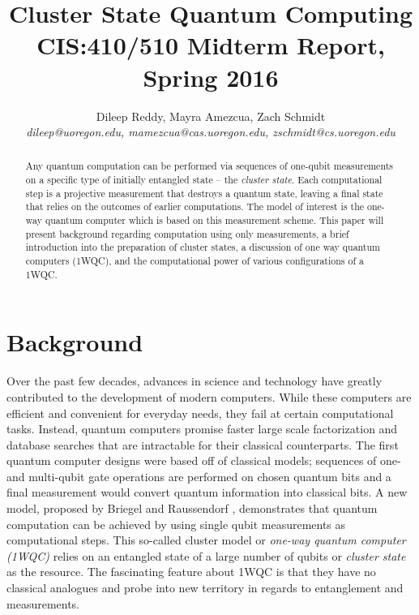 \documentclass[twocolumn]{Styles/IEEEtran11}
\begin{document}


\title{{\Large \bf Cluster State Quantum Computing}\\ {\normalsize CIS:410/510 Midterm Report, Spring 2016}}
\author{
Dileep Reddy, Mayra Amezcua, Zach Schmidt \\
{\em dileep@uoregon.edu, mamezcua@cas.uoregon.edu, zschmidt@cs.uoregon.edu }
}
\maketitle

\begin{abstract}
Any quantum computation can be performed via sequences of one-qubit measurements on a specific type of initially entangled state -- the \textit{cluster state}. Each computational step is a projective measurement that destroys a quantum state, leaving a final state that relies on the outcomes of earlier computations. The model of interest is the one-way quantum computer which is based on this measurement scheme. This paper will present background regarding computation using only measurements, a brief introduction into the preparation of cluster states, a discussion of one way quantum computers (1WQC), and the computational power of various configurations of a 1WQC.
\end{abstract}


\section{Background}
Over the past few decades, advances in science and technology have greatly contributed to the development of modern computers. While these computers are efficient and convenient for everyday needs, they fail at certain computational tasks. Instead, quantum computers promise faster large scale factorization and database searches that are intractable for their classical counterparts. The first quantum computer designs were based off of classical models; sequences of one- and multi-qubit gate operations are performed on chosen quantum bits and a final measurement would convert quantum information into classical bits. A new model, proposed by Briegel and Raussendorf \cite{briegel2000measurements}, demonstrates that quantum computation can be achieved by using single qubit measurements as computational steps. This so-called cluster model or \textit{one-way quantum computer (1WQC)} relies on an entangled state of a large number of qubits or \textit{cluster state} as the resource. The fascinating feature about 1WQC is that they have no classical analogues and probe into new territory in regards to entanglement and measurements. 
\end{document}

